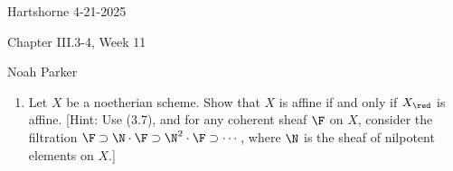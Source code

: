 \documentclass[12pt]{amsart}
\begin{document}
{Hartshorne} \hfill {4-21-2025}

\bigskip\bigskip

\begin{center}

{\sc Chapter III.3-4, Week 11}

\end{center}

\begin{center}

  {Noah Parker} %
    
\end{center}

\bigskip\bigskip

\begin{enumerate}
  \item[3.1.] {
      Let $X$ be a noetherian scheme.
      Show that $X$ is affine if and only if $X_{\red}$ is affine.
      [Hint: Use (3.7), and for any coherent sheaf $\F$ on $X$, consider the filtration $\F\supset \N\cdot \F\supset \N^2\cdot\F\supset\cdots$, where $\N$ is the sheaf of nilpotent elements on $X$.]
    }
\end{enumerate}
\end{document}
